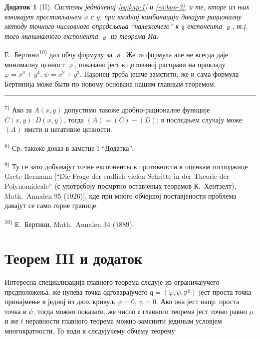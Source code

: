 \documentclass[11pt]{article}
\newcommand{\foreign}[1]{#1}
\theoremstyle{plain}
\newtheorem{zusatz}{Додаток}
\begin{document}
\begin{zusatz}[II]
Системы једначениј \eqref{eq:kap-1} и \eqref{eq:kap-3}, и те, кторе
из њих взникајут прєстављањем $x$ с $y$, при входној комбинацији
давајут рационалну методу точного числовного опрєдєљења
``належечего'' к $\mathfrak{q}$ експонента
$\varrho$, т.ј. того минималного експонента $\varrho$ из теорема Иа.
\end{zusatz}

Е.\ Бертини\textsuperscript{10)} дал обчу формулу за $\varrho$.
Же та формула але не всегда даје минималну цєнност $\varrho$,
показано јест в цитованој расправи на прикладу
$\varphi = x^{3} + y^{4}$, $\psi = x^{2} + y^{3}$. Наконец трєба
јешче замєтити, же и сама формула Бертинија може быти по новому
основана нашим главным теоремом.

\vspace{0.5em}
\noindent\rule{\textwidth}{0.4pt}
\vspace{0.3em}

{\footnotesize
\textsuperscript{7)} Ако за $A(x,y)$ допустимо такоже дробно-рационалне
функције $C(x,y):D(x,y)$, тогда $(A) = (C) - (D)$; в послєдњем
случају може $(A)$ имєти и негативне цєнности.

\textsuperscript{8)} Ср. такоже доказ в замєтце I ``Додатка''.

\textsuperscript{9)} Ту се зато добывајут точне експоненты в противности к
оцєнкам господжице Grete Hermann [``\foreign{Die Frage der endlich vielen Schritte
in der Theorie der Polynomideale}'' (с употрєбоју посмртно оставјеных
теоремов К.\ Хентзелт), \foreign{Math.\ Annalen} 95 (1926)], кде при
много обчејшој поставјености проблема давајут се само горне границе.

\textsuperscript{10)} Е.\ Бертини, \foreign{Math.\ Annalen} 34 (1889).
}

\newpage
\section*{Теорем III и додаток}

Интересна специализација главного теорема слєдује из ограничајучего
прєдположења, же нулева точка одговарајучего
$\mathfrak{q} = (\varphi, \psi, \mathfrak{p}^\varrho)$ јест проста
точка принајмење в једној из двох кривуљ $\varphi = 0$, $\psi = 0$.
Ако она јест напр. проста точка в $\psi$, тогда можно показати, же
число $t$ главного теорема јест точно равно $\mu$ и же $t$
неравности главного теорема можно замєнити јединым условјем
многократности. То води к слєдујучему обчему теорему:
\end{document}
